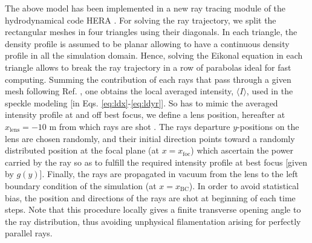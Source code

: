 \documentclass[%
 reprint,
 amsmath,amssymb,
 aps,
]{revtex4-1}
\begin{document}
The above model has been implemented in a new  ray  tracing module of the hydrodynamical code HERA \cite[]{}.
For solving the ray trajectory, we split the rectangular meshes in four triangles using their diagonals.  In each triangle, the density profile is assumed to be planar allowing to have a continuous density profile in all the simulation domain. 
Hence, solving the Eikonal equation in each triangle allows to break the ray trajectory in a row of parabolas ideal for fast computing. 
Summing the contribution of each rays that pass through a given mesh following Ref. \cite[]{POP_Debayle_2019}, one obtains the local averaged intensity, $ \langle I\rangle$, used in the speckle modeling [in Eqs. \eqref{eq:ldx}-\eqref{eq:ldyr}].
So has to mimic the averaged intensity profile at and off best focus, we define a lens position, hereafter at $x_\mathrm{lens}=-10$ m from which rays are shot \cite[]{Lefebvre_2018}. 
The rays departure $y$-positions  on the lens are chosen randomly, and their initial direction points toward a randomly distributed  position at the focal plane (at $x=x_\mathrm{foc}$) which ascertain the power carried by the ray so as to fulfill the required intensity profile at best focus [given by $g(y)$]. 
Finally, the rays are propagated  in vacuum from the lens to the left boundary condition  of the simulation (at $x=x_\mathrm{BC}$).
In order to avoid statistical bias, the position and directions of the rays are shot at beginning of each time steps. 
Note that this procedure locally gives a  finite   transverse opening angle to the ray distribution, thus avoiding unphysical filamentation  arising for perfectly parallel rays. 
\end{document}
